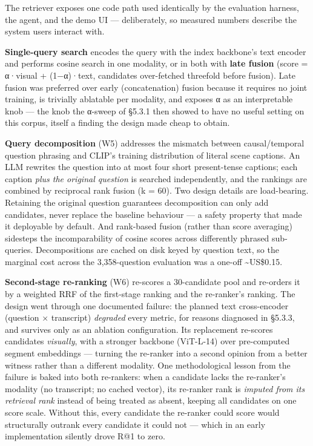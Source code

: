 The retriever exposes one code path used identically by the evaluation
harness, the agent, and the demo UI --- deliberately, so measured
numbers describe the system users interact with.

\textbf{Single-query search} encodes the query with the index backbone's
text encoder and performs cosine search in one modality, or in both with
\textbf{late fusion} (score = α·visual + (1−α)·text, candidates
over-fetched threefold before fusion). Late fusion was preferred over
early (concatenation) fusion because it requires no joint training, is
trivially ablatable per modality, and exposes α as an interpretable knob
--- the knob the α-sweep of §5.3.1 then showed to have no useful setting
on this corpus, itself a finding the design made cheap to obtain.

\textbf{Query decomposition} (W5) addresses the mismatch between
causal/temporal question phrasing and CLIP's training distribution of
literal scene captions. An LLM rewrites the question into at most four
short present-tense captions; each caption \emph{plus the original
question} is searched independently, and the rankings are combined by
reciprocal rank fusion (k = 60). Two design details are load-bearing.
Retaining the original question guarantees decomposition can only add
candidates, never replace the baseline behaviour --- a safety property
that made it deployable by default. And rank-based fusion (rather than
score averaging) sidesteps the incomparability of cosine scores across
differently phrased sub-queries. Decompositions are cached on disk keyed
by question text, so the marginal cost across the 3,358-question
evaluation was a one-off \textasciitilde US\$0.15.

\textbf{Second-stage re-ranking} (W6) re-scores a 30-candidate pool and
re-orders it by a weighted RRF of the first-stage ranking and the
re-ranker's ranking. The design went through one documented failure: the
planned text cross-encoder (question × transcript) \emph{degraded} every
metric, for reasons diagnosed in §5.3.3, and survives only as an
ablation configuration. Its replacement re-scores candidates
\emph{visually}, with a stronger backbone (ViT-L-14) over pre-computed
segment embeddings --- turning the re-ranker into a second opinion from
a better witness rather than a different modality. One methodological
lesson from the failure is baked into both re-rankers: when a candidate
lacks the re-ranker's modality (no transcript; no cached vector), its
re-ranker rank is \emph{imputed from its retrieval rank} instead of
being treated as absent, keeping all candidates on one score scale.
Without this, every candidate the re-ranker could score would
structurally outrank every candidate it could not --- which in an early
implementation silently drove R@1 to zero.

